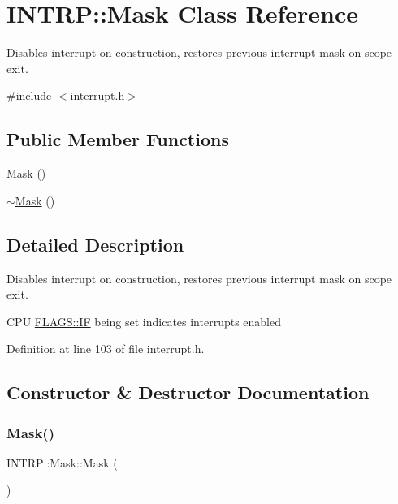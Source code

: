 \hypertarget{class_i_n_t_r_p_1_1_mask}{}\section{I\+N\+T\+RP\+:\+:Mask Class Reference}
\label{class_i_n_t_r_p_1_1_mask}


Disables interrupt on construction, restores previous interrupt mask on scope exit.  




{\ttfamily \#include $<$interrupt.\+h$>$}

\subsection*{Public Member Functions}
\begin{DoxyCompactItemize}
\item 
\hyperlink{class_i_n_t_r_p_1_1_mask_addd528b308ed524deeac0c632e07d467}{Mask} ()
\item 
\hyperlink{class_i_n_t_r_p_1_1_mask_a9510ca576c94618168e76d14521c3e6d}{$\sim$\+Mask} ()
\end{DoxyCompactItemize}


\subsection{Detailed Description}
Disables interrupt on construction, restores previous interrupt mask on scope exit. 

C\+PU \hyperlink{namespace_f_l_a_g_s_a9d5f9747a4879f4d57418def02a8fb51aec02296c8246d8621db2de2314b6728d}{F\+L\+A\+G\+S\+::\+IF} being set indicates interrupts enabled 

Definition at line 103 of file interrupt.\+h.



\subsection{Constructor \& Destructor Documentation}
\mbox{\label{class_i_n_t_r_p_1_1_mask_addd528b308ed524deeac0c632e07d467}} 
\subsubsection{\texorpdfstring{Mask()}{Mask()}}
{\footnotesize\ttfamily I\+N\+T\+R\+P\+::\+Mask\+::\+Mask (\begin{DoxyParamCaption}{ }\end{DoxyParamCaption})\hspace{0.3cm}{\ttfamily [inline]}}



